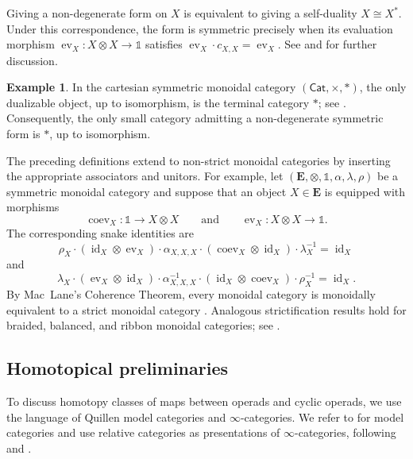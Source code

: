\documentclass{amsart}
\newcommand{\bE}{\mathbf{E}}
\newcommand{\Cat}{\mathsf{Cat}}
\newcommand{\id}{\operatorname{id}}
\newcommand{\ev}{\operatorname{ev}}
\newcommand{\coev}{\operatorname{coev}}
\theoremstyle{definition}
\newtheorem{example}[theorem]{Example}%
\numberwithin{equation}{section}
\begin{document}
Giving a non-degenerate form on $X$ is equivalent to giving a
self-duality $X\cong X^*$. Under this correspondence, the form is
symmetric precisely when its evaluation morphism
$\ev_X\colon X\otimes X\to\mathbb{1}$ satisfies
$\ev_X\cdot c_{X,X}=\ev_X$. See
\cite[Sections~2.1.1 and~3.1.2]{hv_cyclic} and
\cite{lukacs2010cyclic} for further discussion.
\begin{example}
In the cartesian symmetric monoidal category $(\Cat,\times,*)$, the
only dualizable object, up to isomorphism, is the terminal category
$*$; see \cite[Remark~2.15]{lukacs2010cyclic}. Consequently, the only
small category admitting a non-degenerate symmetric form is $*$,
up to isomorphism.
\end{example}

The preceding definitions extend to non-strict monoidal categories
by inserting the appropriate associators and unitors. For example,
let $(\bE,\otimes,\mathbb{1},\alpha,\lambda,\rho)$ be a symmetric
monoidal category and suppose that an object $X\in\bE$ is equipped
with morphisms
\[
\coev_X\colon\mathbb{1}\longrightarrow X\otimes X
\qquad \text{and} \qquad
\ev_X\colon X\otimes X\longrightarrow\mathbb{1}.
\]
The corresponding snake identities are
\begin{equation}
\label{eq:non-strict-snake-right}
\rho_X
\cdot(\id_X\otimes\ev_X)
\cdot\alpha_{X,X,X}
\cdot(\coev_X\otimes\id_X)
\cdot\lambda_X^{-1}
=
\id_X
\end{equation}
and
\begin{equation}
\label{eq:non-strict-snake-left}
\lambda_X
\cdot(\ev_X\otimes\id_X)
\cdot\alpha_{X,X,X}^{-1}
\cdot(\id_X\otimes\coev_X)
\cdot\rho_X^{-1}
=
\id_X.
\end{equation}
By Mac~Lane's Coherence Theorem, every monoidal category is monoidally equivalent to a strict monoidal category \cite{MacLane_1963}. Analogous strictification results hold for braided, balanced, and ribbon monoidal categories; see \cite{Joyal_Street_Braided_Tensor_Categories,shum_tortile_1994}.

\subsection{Homotopical preliminaries}
\label{subsec: Homotopical Preliminaries}

To discuss homotopy classes of maps between operads and cyclic operads, we use the language of Quillen model categories and $\infty$-categories. We refer to \cite{hirsch,balchin} for model categories and use relative categories as presentations of $\infty$-categories, following \cite{barwick_kan} and \cite[Chapter~13]{balchin}.
\end{document}
